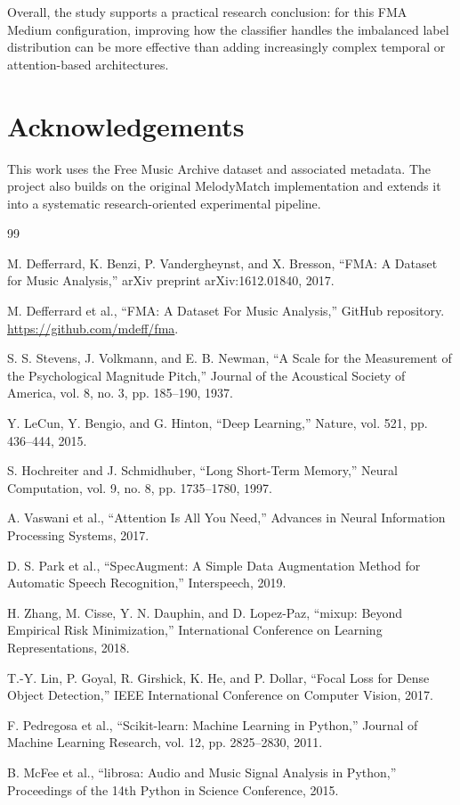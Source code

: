 \documentclass[11pt,a4paper]{article}
\begin{document}
Overall, the study supports a practical research conclusion: for this FMA Medium configuration, improving how the classifier handles the imbalanced label distribution can be more effective than adding increasingly complex temporal or attention-based architectures.

\section*{Acknowledgements}

This work uses the Free Music Archive dataset and associated metadata. The project also builds on the original MelodyMatch implementation and extends it into a systematic research-oriented experimental pipeline.

\begin{thebibliography}{99}

M. Defferrard, K. Benzi, P. Vandergheynst, and X. Bresson,
``FMA: A Dataset for Music Analysis,''
arXiv preprint arXiv:1612.01840, 2017.

M. Defferrard et al.,
``FMA: A Dataset For Music Analysis,''
GitHub repository.
\url{https://github.com/mdeff/fma}.

S. S. Stevens, J. Volkmann, and E. B. Newman,
``A Scale for the Measurement of the Psychological Magnitude Pitch,''
Journal of the Acoustical Society of America, vol. 8, no. 3, pp. 185--190, 1937.

Y. LeCun, Y. Bengio, and G. Hinton,
``Deep Learning,''
Nature, vol. 521, pp. 436--444, 2015.

S. Hochreiter and J. Schmidhuber,
``Long Short-Term Memory,''
Neural Computation, vol. 9, no. 8, pp. 1735--1780, 1997.

A. Vaswani et al.,
``Attention Is All You Need,''
Advances in Neural Information Processing Systems, 2017.

D. S. Park et al.,
``SpecAugment: A Simple Data Augmentation Method for Automatic Speech Recognition,''
Interspeech, 2019.

H. Zhang, M. Cisse, Y. N. Dauphin, and D. Lopez-Paz,
``mixup: Beyond Empirical Risk Minimization,''
International Conference on Learning Representations, 2018.

T.-Y. Lin, P. Goyal, R. Girshick, K. He, and P. Dollar,
``Focal Loss for Dense Object Detection,''
IEEE International Conference on Computer Vision, 2017.

F. Pedregosa et al.,
``Scikit-learn: Machine Learning in Python,''
Journal of Machine Learning Research, vol. 12, pp. 2825--2830, 2011.

B. McFee et al.,
``librosa: Audio and Music Signal Analysis in Python,''
Proceedings of the 14th Python in Science Conference, 2015.

\end{thebibliography}
\end{document}
